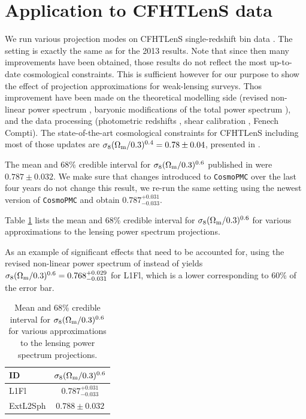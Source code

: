\documentclass[useAMS,usenatbib]{mn2e} %
\begin{document}
\section{Application to CFHTLenS data}
\label{sec:cfhtlens}

We run various projection modes on CFHTLenS single-redshift bin data
\cite{CFHTLenS-2pt-notomo}. The setting is exactly the same as for the 2013
results. Note that since then many improvements have been obtained, those
results do not reflect the most up-to-date cosmological constraints. This is
sufficient however for our purpose to show the effect of projection
approximations for weak-lensing surveys. Thos improvement have been made on the
theoretical modelling side (revised non-linear power spectrum
\cite{2012ApJ...761..152T}, baryonic modifications of the total power spectrum
\cite{2015MNRAS.454.1958M}), and the data processing (photometric redshifts
\cite{2016MNRAS.463.3737C,joudaki/etal:2016}, shear calibration
\cite{KiDS-450}, Fenech Compti). The state-of-the-art cosmological constraints
for CFHTLenS including most of those updates are $\sigma_8 (\Omega_{\rm
m}/0.3)^{0.4} = 0.78\pm{0.04}$, presented in \cite{joudaki/etal:2016}.

The mean and 68\% credible interval for $\sigma_8 (\Omega_{\rm m}/0.3)^{0.6}$
published in \cite{CFHTLenS-2pt-notomo} were $0.787 \pm 0.032$. We make sure
that changes introduced to \texttt{CosmoPMC} over the last four years do not
change this result, we re-run the same setting using the newest version of
\texttt{CosmoPMC} and obtain $0.787^{+0.031}_{-0.033}$.

Table \ref{tab:CFHTLenS_Sigma8} lists the mean and 68\% credible interval for
$\sigma_8 (\Omega_{\rm m}/0.3)^{0.6}$ for various approximations to the lensing
power spectrum projections.

As an example of significant effects that need to be accounted for, using the
revised non-linear power spectrum of \cite{2012ApJ...761..152T} instead of
\cite{2003MNRAS.341.1311S} yields $\sigma_8 (\Omega_{\rm m}/0.3)^{0.6} =
0.768^{+0.029}_{-0.031}$ for L1Fl, which is a lower corresponding to 60\% of
the error bar.

\begin{table}

  \label{tab:CFHTLenS_Sigma8}

  \caption{Mean and 68\% credible interval for 
  $\sigma_8 (\Omega_{\rm m}/0.3)^{0.6}$ for various approximations to the lensing
  power spectrum projections.}

  \begin{tabular}{lc} \hline
  ID       & $\sigma_8 (\Omega_{\rm m}/0.3)^{0.6}$ \\ \hline
  L1Fl     & $0.787^{+0.031}_{-0.033}$ \\
  ExtL2Sph & $0.788 \pm 0.032$ \\ \hline
  \end{tabular}

\end{table}
\end{document}
